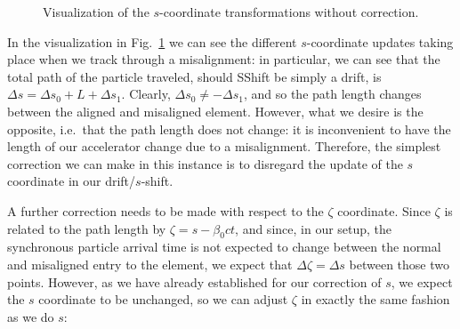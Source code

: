 \begin{figure}[H]
	\caption{Visualization of the $s$-coordinate transformations without correction.}\label{fig:no-s-no-zeta-correction}
\end{figure}

In the visualization in Fig.~\ref{fig:no-s-no-zeta-correction} we can see the different $s$-coordinate updates taking place when we track through a misalignment: in particular, we can see that the total path of the particle traveled, should SShift be simply a drift, is $\Delta s = \Delta s_0 + L + \Delta s_1$.
Clearly, $\Delta s_0 \neq -\Delta s_1$, and so the path length changes between the aligned and misaligned element.
However, what we desire is the opposite, i.e.~that the path length does not change: it is inconvenient to have the length of our accelerator change due to a misalignment.
Therefore, the simplest correction we can make in this instance is to disregard the update of the $s$ coordinate in our drift/$s$-shift.

A further correction needs to be made with respect to the $\zeta$ coordinate.
Since $\zeta$ is related to the path length by $\zeta = s - \beta_0 c t$, and since, in our setup, the synchronous particle arrival time is not expected to change between the normal and misaligned entry to the element, we expect that $\Delta \zeta = \Delta s$ between those two points.
However, as we have already established for our correction of $s$, we expect the $s$ coordinate to be unchanged, so we can adjust $\zeta$ in exactly the same fashion as we do $s$:

